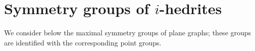 \documentclass[12pt]{article}
\begin{document}
\section{Symmetry groups of $i$-hedrites}
We consider below the maximal symmetry groups of plane graphs; these groups are identified with the corresponding point groups.



%
%
%
\end{document}

